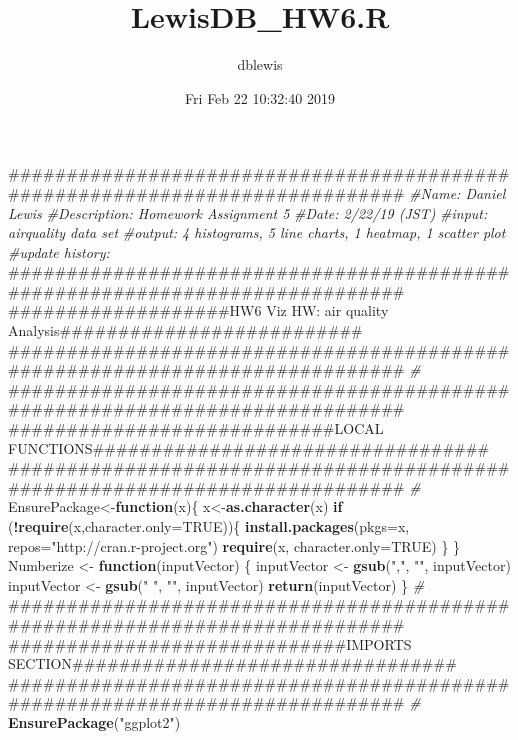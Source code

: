 \documentclass[]{article}
\title{LewisDB\_HW6.R}
\author{dblewis}
\date{Fri Feb 22 10:32:40 2019}
\newenvironment{Shaded}{\begin{snugshade}}{\end{snugshade}}
\newcommand{\KeywordTok}[1]{\textcolor[rgb]{0.13,0.29,0.53}{\textbf{#1}}}
\newcommand{\DataTypeTok}[1]{\textcolor[rgb]{0.13,0.29,0.53}{#1}}
\newcommand{\StringTok}[1]{\textcolor[rgb]{0.31,0.60,0.02}{#1}}
\newcommand{\CommentTok}[1]{\textcolor[rgb]{0.56,0.35,0.01}{\textit{#1}}}
\newcommand{\OtherTok}[1]{\textcolor[rgb]{0.56,0.35,0.01}{#1}}
\newcommand{\ControlFlowTok}[1]{\textcolor[rgb]{0.13,0.29,0.53}{\textbf{#1}}}
\newcommand{\OperatorTok}[1]{\textcolor[rgb]{0.81,0.36,0.00}{\textbf{#1}}}
\newcommand{\NormalTok}[1]{#1}
\begin{document}
\maketitle

\begin{Shaded}
\begin{Highlighting}[]
\NormalTok{#############################################################################}
\CommentTok{#Name: Daniel Lewis}
\CommentTok{#Description: Homework Assignment 5}
\CommentTok{#Date: 2/22/19 (JST)}
\CommentTok{#input: airquality data set}
\CommentTok{#output: 4 histograms, 5 line charts, 1 heatmap, 1 scatter plot}
\CommentTok{#update history:}
\NormalTok{#############################################################################}
\NormalTok{###################HW6 Viz HW: air quality Analysis##########################}
\NormalTok{#############################################################################}
\CommentTok{#}
\NormalTok{#############################################################################}
\NormalTok{############################LOCAL FUNCTIONS##################################}
\NormalTok{#############################################################################}
\CommentTok{#}
\NormalTok{EnsurePackage<-}\ControlFlowTok{function}\NormalTok{(x)\{}
\NormalTok{   x<-}\KeywordTok{as.character}\NormalTok{(x)}
   \ControlFlowTok{if}\NormalTok{ (}\OperatorTok{!}\KeywordTok{require}\NormalTok{(x,}\DataTypeTok{character.only=}\OtherTok{TRUE}\NormalTok{))\{}
       \KeywordTok{install.packages}\NormalTok{(}\DataTypeTok{pkgs=}\NormalTok{x, }\DataTypeTok{repos=}\StringTok{"http://cran.r-project.org"}\NormalTok{)}
       \KeywordTok{require}\NormalTok{(x, }\DataTypeTok{character.only=}\OtherTok{TRUE}\NormalTok{)}
\NormalTok{     \}}
\NormalTok{\}}
\NormalTok{Numberize <-}\StringTok{ }\ControlFlowTok{function}\NormalTok{(inputVector)}
\NormalTok{\{}
\NormalTok{  inputVector <-}\StringTok{ }\KeywordTok{gsub}\NormalTok{(}\StringTok{","}\NormalTok{, }\StringTok{""}\NormalTok{, inputVector)}
\NormalTok{  inputVector <-}\StringTok{ }\KeywordTok{gsub}\NormalTok{(}\StringTok{" "}\NormalTok{, }\StringTok{""}\NormalTok{, inputVector)}
  \KeywordTok{return}\NormalTok{(inputVector)}
\NormalTok{\}}
\CommentTok{#}
\NormalTok{#############################################################################}
\NormalTok{#############################IMPORTS SECTION#################################}
\NormalTok{#############################################################################}
\CommentTok{#}
\KeywordTok{EnsurePackage}\NormalTok{(}\StringTok{"ggplot2"}\NormalTok{)}
\end{Highlighting}
\end{Shaded}
\end{document}
